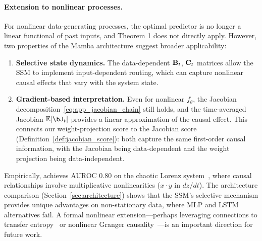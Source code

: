 \paragraph{Extension to nonlinear processes.}
For nonlinear data-generating processes, the optimal predictor is no
longer a linear functional of past inputs, and Theorem 1 does not
directly apply. However, two properties of the Mamba architecture
suggest broader applicability:
\begin{enumerate}
    \item \textbf{Selective state dynamics.} The data-dependent
    $\mathbf{B}_t$, $\mathbf{C}_t$ matrices allow the SSM to implement
    input-dependent routing, which can capture nonlinear causal
    effects that vary with the system state.

    \item \textbf{Gradient-based interpretation.} Even for nonlinear
    $f_\theta$, the Jacobian decomposition~\eqref{eq:app_jacobian_chain}
    still holds, and the time-averaged Jacobian $\E[\bJ_t]$ provides a
    linear approximation of the causal effect. This connects our
    weight-projection score to the Jacobian score
    (Definition~\ref{def:jacobian_score}): both capture the same
    first-order causal information, with the Jacobian being
    data-dependent and the weight projection being data-independent.
\end{enumerate}

Empirically, \methodname{} achieves AUROC 0.80 on the chaotic Lorenz
system~\citep{lorenz1963deterministic}, where causal relationships
involve multiplicative nonlinearities ($x \cdot y$ in $dz/dt$). The
architecture comparison (Section~\ref{sec:architecture}) shows that
the SSM's selective mechanism provides unique advantages on
non-stationary data, where MLP and LSTM alternatives fail. A formal
nonlinear extension---perhaps leveraging connections to transfer
entropy~\citep{schreiber2000measuring} or nonlinear Granger
causality~\citep{marinazzo2008kernel}---is an important direction for
future work.
